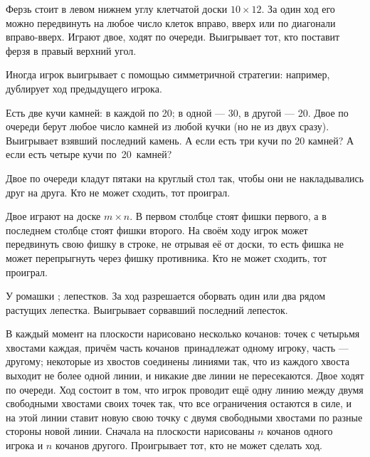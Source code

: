 \documentclass[a4paper,12pt]{article}
\begin{document}
Ферзь стоит в левом нижнем углу клетчатой доски $10\times12$. За один ход его
можно передвинуть на любое число клеток вправо, вверх или по диагонали
 вправо-вверх. Играют двое, ходят по очереди. Выигрывает тот,
кто поставит ферзя в правый верхний угол.



{\small Иногда игрок выигрывает с помощью
 симметричной стратегии: например, дублирует ход предыдущего
игрока.}

\vspace*{1truemm}

Есть две кучи камней:
 в каждой по 20;
 в одной --- 30, в другой --- 20.
Двое по очереди берут любое число камней из
любой кучки (но не из двух сразу). Выигрывает взявший последний камень.
 А если есть три кучи по 20 камней?
 А если есть четыре кучи по~20~камней?

Двое по очереди кладут пятаки на круглый
стол так, чтобы они не накладывались друг на друга. Кто не может
сходить, тот проиграл.

Двое играют на доске $m\times n$. В первом
столбце стоят фишки первого, а в последнем столбце стоят фишки
второго. На своём ходу игрок может передвинуть свою фишку в
строке, не отрывая её от доски, то есть фишка не может
перепрыгнуть через фишку противника. Кто не может сходить, тот
проиграл.

У ромашки ;  лепестков. За ход
разрешается оборвать один или два рядом растущих лепестка.
Выигрывает сорвавший последний лепесток.

 В каждый момент на плоскости нарисовано несколько
 кочанов: точек с четырьмя хвостами каждая, причём часть
 кочанов\ принадлежат одному игроку,
часть --- другому; некоторые из хвостов  соединены линиями так, что из
каждого хвоста выходит не более  одной  линии, и никакие две линии не
пересекаются. Двое ходят по очереди. Ход состоит в том, что игрок проводит
ещё одну линию между двумя свободными хвостами своих точек так,
что все
ограничения остаются в силе, и на  этой  линии ставит новую свою точку с
двумя свободными хвостами по  разные  стороны новой линии. Сначала
на плоскости нарисованы $n$ кочанов одного игрока
и $n$ кочанов другого. Проигрывает тот, кто не может сделать ход.

\break

\end{document}
